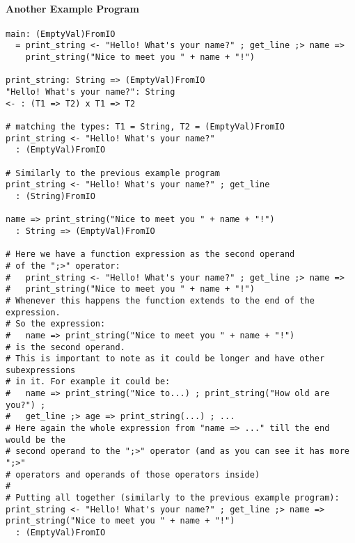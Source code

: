 \documentclass{article}
\begin{document}
\newpage
\paragraph{Another Example Program}
\begin{verbatim}
main: (EmptyVal)FromIO
  = print_string <- "Hello! What's your name?" ; get_line ;> name =>
    print_string("Nice to meet you " + name + "!") 

print_string: String => (EmptyVal)FromIO
"Hello! What's your name?": String
<- : (T1 => T2) x T1 => T2

# matching the types: T1 = String, T2 = (EmptyVal)FromIO 
print_string <- "Hello! What's your name?"
  : (EmptyVal)FromIO

# Similarly to the previous example program
print_string <- "Hello! What's your name?" ; get_line
  : (String)FromIO

name => print_string("Nice to meet you " + name + "!") 
  : String => (EmptyVal)FromIO

# Here we have a function expression as the second operand
# of the ";>" operator:
#   print_string <- "Hello! What's your name?" ; get_line ;> name =>
#   print_string("Nice to meet you " + name + "!") 
# Whenever this happens the function extends to the end of the expression.
# So the expression:
#   name => print_string("Nice to meet you " + name + "!") 
# is the second operand.
# This is important to note as it could be longer and have other subexpressions
# in it. For example it could be:
#   name => print_string("Nice to...) ; print_string("How old are you?") ;
#   get_line ;> age => print_string(...) ; ...
# Here again the whole expression from "name => ..." till the end would be the
# second operand to the ";>" operator (and as you can see it has more ";>"
# operators and operands of those operators inside)
# 
# Putting all together (similarly to the previous example program):
print_string <- "Hello! What's your name?" ; get_line ;> name =>
print_string("Nice to meet you " + name + "!") 
  : (EmptyVal)FromIO
\end{verbatim}
\end{document}
